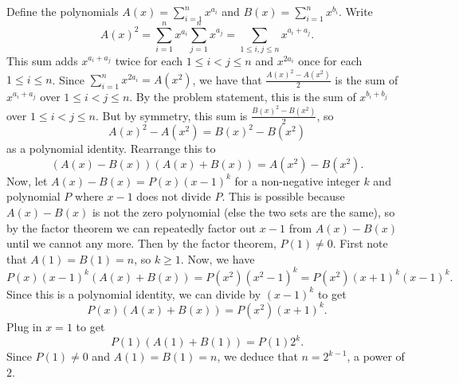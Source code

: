 Define the polynomials $A(x)=\displaystyle\sum_{i=1}^nx^{a_i}$ and $B(x)=\displaystyle\sum_{i=1}^nx^{b_i}$. Write \[A(x)^2=\displaystyle\sum_{i=1}^nx^{a_i}\displaystyle\sum_{j=1}^nx^{a_j}=\displaystyle\sum_{1\leq i,j\leq n}x^{a_i+a_j}.\] This sum adds $x^{a_i+a_j}$ twice for each $1\leq i<j\leq n$ and $x^{2a_i}$ once for each $1\leq i\leq n$. Since $\displaystyle\sum_{i=1}^nx^{2a_i}=A(x^2)$, we have that $\frac{A(x)^2-A(x^2)}{2}$ is the sum of $x^{a_i+a_j}$ over $1\leq i<j\leq n$. By the problem statement, this is the sum of $x^{b_i+b_j}$ over $1\leq i<j\leq n$. But by symmetry, this sum is $\frac{B(x)^2-B(x^2)}{2}$, so \[A(x)^2-A(x^2)=B(x)^2-B(x^2)\] as a polynomial identity. Rearrange this to \[\left(A(x)-B(x)\right)\left(A(x)+B(x)\right)=A(x^2)-B(x^2).\] Now, let $A(x)-B(x)=P(x)(x-1)^k$ for a non-negative integer $k$ and polynomial $P$ where $x-1$ does not divide $P$. This is possible because $A(x)-B(x)$ is not the zero polynomial (else the two sets are the same), so by the factor theorem we can repeatedly factor out $x-1$ from $A(x)-B(x)$ until we cannot any more. Then by the factor theorem, $P(1)\neq0$. First note that $A(1)=B(1)=n$, so $k\geq1$. Now, we have \[P(x)(x-1)^k\left(A(x)+B(x)\right)=P(x^2)(x^2-1)^k=P(x^2)(x+1)^k(x-1)^k.\] Since this is a polynomial identity, we can divide by $(x-1)^k$ to get \[P(x)\left(A(x)+B(x)\right)=P(x^2)(x+1)^k.\] Plug in $x=1$ to get \[P(1)\left(A(1)+B(1)\right)=P(1)2^k.\] Since $P(1)\neq0$ and $A(1)=B(1)=n$, we deduce that $n=2^{k-1}$, a power of $2$.
